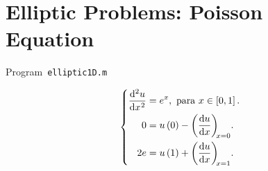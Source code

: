\section{Elliptic Problems: Poisson Equation}

\begin{listing}[ht!]
    \tiny
    \centering
    \caption{Program~\texttt{elliptic1D.m}}
    \label{code:elliptic1D.m}
\end{listing}

\begin{equation}\label{eq:poisson1drobindconditions}
    \left\{
    \begin{aligned}
        \diff[2]{u}{x}
         & =e^{x},
        \text{ para }x\in\left[0,1\right].     \\
        0
         & = u\left(0\right)-\diff{u}{x}[x=0]. \\
        2e
         & =u\left(1\right)+\diff{u}{x}[x=1].
    \end{aligned}
    \right.
\end{equation}

